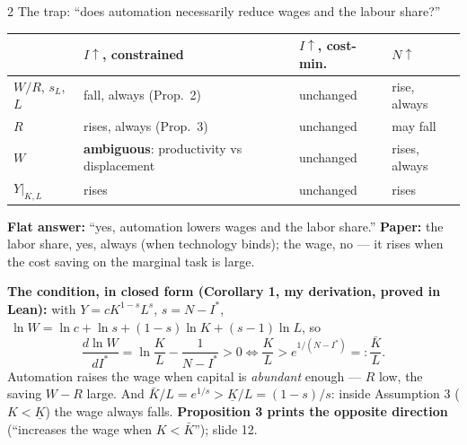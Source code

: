 \documentclass[aspectratio=169,11pt]{beamer}
\begin{document}
\begin{frame}{2 \textperiodcentered{} The trap: ``does automation necessarily reduce wages and the labour share?''}
  \footnotesize
  \begin{center}\scriptsize
  \begin{tabular}{@{}llll@{}}
    \toprule
    & $I\uparrow$, constrained & $I\uparrow$, cost-min. & $N\uparrow$\\
    \midrule
    $W/R$, $s_L$, $L$ & fall, always (Prop.\ 2) & unchanged & rise, always\\
    $R$ & rises, always (Prop.\ 3) & unchanged & may fall\\
    $W$ & \textbf{ambiguous}: productivity vs displacement & unchanged & rises, always\\
    $Y|_{K,L}$ & rises & unchanged & rises\\
    \bottomrule
  \end{tabular}
  \end{center}
  \textbf{Flat answer:} ``yes, automation lowers wages and the labor share.'' \textbf{Paper:} the labor share, yes,
  always (when technology binds); the wage, no --- it rises when the cost saving on the marginal task is large.

  \smallskip
  \textbf{The condition, in closed form (Corollary 1, my derivation, proved in Lean):} with
  $Y=cK^{1-s}L^{s}$, $s=N-I^*$, $\ \ln W=\ln c+\ln s+(1-s)\ln K+(s-1)\ln L$, so
  \[
    \frac{d\ln W}{dI^*}=\ln\frac KL-\frac1{N-I^*}>0\iff \frac KL>e^{1/(N-I^*)}=:\frac{\bar K}{L}.
  \]
  Automation raises the wage when capital is \emph{abundant} enough --- $R$ low, the saving $W-R$ large. And
  $\bar K/L=e^{1/s}>\underline K/L=(1-s)/s$: inside Assumption 3 ($K<\underline K$) the wage always falls.
  \textbf{Proposition 3 prints the opposite direction} (``increases the wage when $K<\bar K$''); slide 12.
\end{frame}
\end{document}
